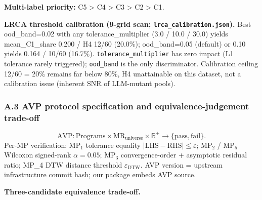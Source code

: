 \documentclass[review,12pt,authoryear]{elsarticle}
\begin{document}
\textbf{Multi-label priority:} C5 \textgreater{} C4 \textgreater{} C3
\textgreater{} C2 \textgreater{} C1.

\textbf{LRCA threshold calibration (9-grid scan;
\texttt{lrca\_calibration.json}).} Best ood\_band=0.02 with any
tolerance\_multiplier (3.0 / 10.0 / 30.0) yields mean\_C1\_share 0.200 /
H4 12/60 (20.0\%); ood\_band=0.05 (default) or 0.10 yields 0.164 / 10/60
(16.7\%). \texttt{tolerance\_multiplier} has zero impact (L1 tolerance
rarely triggered); \texttt{ood\_band} is the only discriminator.
Calibration ceiling 12/60 = 20\% remains far below 80\%, H4
unattainable on this dataset, not a calibration issue (inherent SNR of
LLM-mutant pools).

\subsubsection{A.3 AVP protocol specification and equivalence-judgement trade-off}\label{a.3-avp-protocol-specification-and-equivalence-judgement-trade-off}

\[
\mathrm{AVP}: \mathrm{Programs} \times \mathrm{MR}_{\mathrm{universe}} \times \mathbb{R}^{+} \to \{\mathrm{pass}, \mathrm{fail}\}.
\]
Per-MP verification: $\mathrm{MP}_1$ tolerance equality $|\mathrm{LHS} -
\mathrm{RHS}| \leq \varepsilon$; $\mathrm{MP}_2$ / $\mathrm{MP}_5$ Wilcoxon signed-rank $\alpha=0.05$; $\mathrm{MP}_3$
convergence-order + asymptotic residual ratio; MP\_4 DTW distance
threshold $\varepsilon_{\mathrm{DTW}}$. AVP version = upstream infrastructure commit hash; our package embeds
AVP source.

\textbf{Three-candidate equivalence trade-off.}
\end{document}
